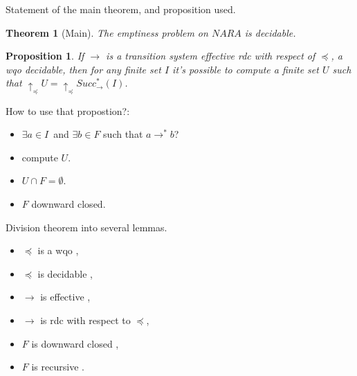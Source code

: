 \documentclass{beamer}
\newtheorem{thr}{Theorem} %
\newtheorem{pp}{Proposition}
\begin{document}
\begin{frame}{Statement of the main theorem, and proposition used.}
\begin{thr}[Main]
 The emptiness problem on $NARA$ is decidable.
\end{thr}
  \pause
 \begin{pp} 
   If  $\rightarrow$ is a transition system effective rdc with respect of $\preceq$, a wqo decidable, then for any finite set $I$ it's possible to compute a finite set $U$ such that
   $\uparrow_\preceq U=\uparrow_\preceq Succ^*_\rightarrow (I)$.
 \end{pp}
\pause
How to use that propostion?:
\begin{itemize}
\pause
 \item $\exists a \in I$\ and $\exists b \in F$ such that $ a \rightarrow^* b $? \pause
 \item compute $U$. \pause
 \item $U \cap F = \emptyset$. \pause
 \item $F$ downward closed.
\end{itemize}


\end{frame}


\begin{frame}{Division theorem into several lemmas.}
 \begin{itemize}
 \item $\preceq$ is a wqo ,
 	\item $\preceq$ is decidable ,
 	\item $\rightarrow$ is effective ,
	\item $\rightarrow$ is rdc with respect to $\preceq$,
 	\item $F$ is downward closed ,
 	\item $F$ is recursive .
  \end{itemize}
\end{frame}
\end{document}
